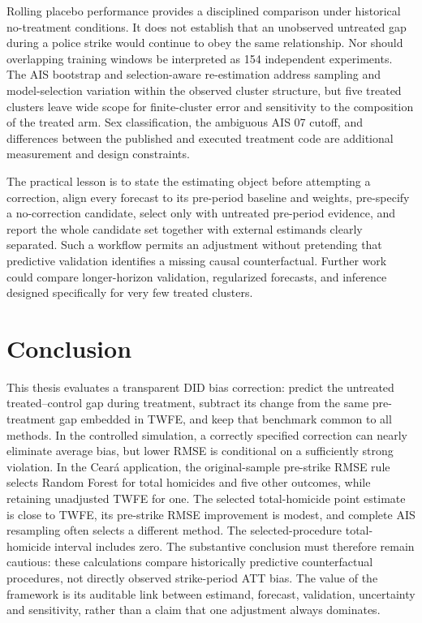 Rolling placebo performance provides a disciplined comparison under historical no-treatment conditions. It does not establish that an unobserved untreated gap during a police strike would continue to obey the same relationship. Nor should overlapping training windows be interpreted as 154 independent experiments. The AIS bootstrap and selection-aware re-estimation address sampling and model-selection variation within the observed cluster structure, but five treated clusters leave wide scope for finite-cluster error and sensitivity to the composition of the treated arm. Sex classification, the ambiguous AIS 07 cutoff, and differences between the published and executed treatment code are additional measurement and design constraints.

The practical lesson is to state the estimating object before attempting a correction, align every forecast to its pre-period baseline and weights, pre-specify a no-correction candidate, select only with untreated pre-period evidence, and report the whole candidate set together with external estimands clearly separated. Such a workflow permits an adjustment without pretending that predictive validation identifies a missing causal counterfactual. Further work could compare longer-horizon validation, regularized forecasts, and inference designed specifically for very few treated clusters.

\section{Conclusion}\label{sec:conclusion}
This thesis evaluates a transparent DID bias correction: predict the untreated treated--control gap during treatment, subtract its change from the same pre-treatment gap embedded in TWFE, and keep that benchmark common to all methods. In the controlled simulation, a correctly specified correction can nearly eliminate average bias, but lower RMSE is conditional on a sufficiently strong violation. In the Cear\'a application, the original-sample pre-strike RMSE rule selects Random Forest for total homicides and five other outcomes, while retaining unadjusted TWFE for one. The selected total-homicide point estimate is close to TWFE, its pre-strike RMSE improvement is modest, and complete AIS resampling often selects a different method. The selected-procedure total-homicide interval includes zero. The substantive conclusion must therefore remain cautious: these calculations compare historically predictive counterfactual procedures, not directly observed strike-period ATT bias. The value of the framework is its auditable link between estimand, forecast, validation, uncertainty and sensitivity, rather than a claim that one adjustment always dominates.
